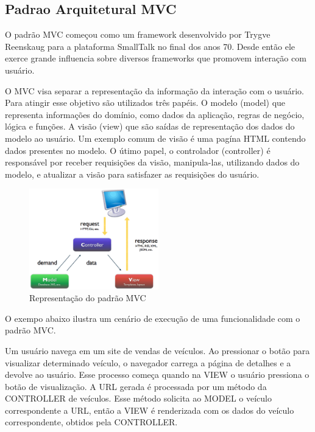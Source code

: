 
\subsection{Padrao Arquitetural MVC}

O padrão MVC começou como um framework desenvolvido por Trygve Reenskaug para a plataforma SmallTalk no final dos anos 70. Desde então ele exerce grande influencia sobre diversos frameworks que promovem interação com usuário.

O MVC visa separar a representação da informação da interação com o usuário. Para atingir esse objetivo são utilizados três papéis. O modelo (model) que representa informações do domínio, como dados da aplicação, regras de negócio, lógica e funções. A visão (view) que são saídas de representação dos dados do modelo ao usuário. Um exemplo comum de visão é uma pagína HTML contendo dados presentes no modelo. O útimo papel, o controlador (controller) é responsável por receber requisições da visão, manipula-las, utilizando dados do modelo, e atualizar a visão para satisfazer as requisições do usuário.

\graphicspath{{figuras/}}
\begin{figure}[H]
\centering
\includegraphics[width=0.5\textwidth]{mvc}
\caption{Representação do padrão MVC}
\label{mvc}
\end{figure}

O exempo abaixo ilustra um cenário de execução de uma funcionalidade com o padrão MVC.

\begin{mdframed}[frametitle={Exemplo},roundcorner=5pt, backgroundcolor=lightgray]
Um usuário navega em um site de vendas de veículos. Ao pressionar o botão para visualizar determinado veículo, o navegador carrega a página de detalhes e a devolve ao usuário. Esse processo começa quando na VIEW o usuário pressiona o botão de visualização. A URL gerada é processada por um método da CONTROLLER de veículos. Esse método solicita ao MODEL o veículo correspondente a URL, então a VIEW é renderizada com os dados do veículo correspondente, obtidos pela CONTROLLER.
\end{mdframed}

